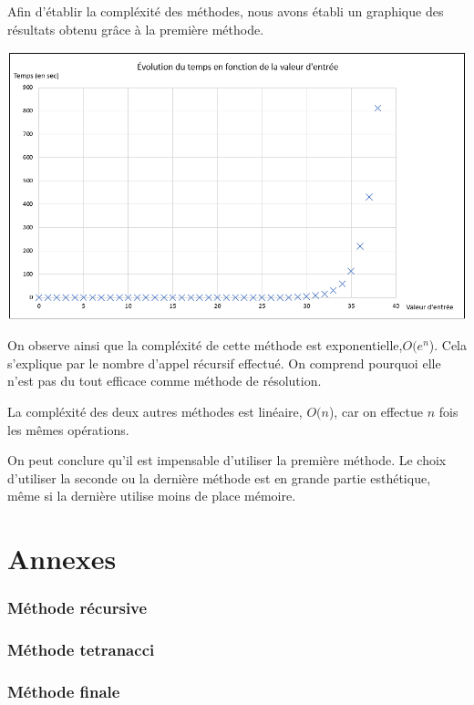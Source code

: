 \documentclass{article}
\newcommand{\code}[1]{}
\begin{document}
Afin d'établir la compléxité des méthodes, nous avons établi un graphique des résultats obtenu grâce à la première méthode.

\bigbreak
\begin{center}
\includegraphics[scale = 0.5]{Images/graphique.png}
\end{center}
\bigbreak

On observe ainsi que la compléxité de cette méthode est exponentielle,$ O(e^n$). Cela s'explique par le nombre d'appel récursif effectué. On comprend pourquoi elle n'est pas du tout efficace comme méthode de résolution.

La compléxité des deux autres méthodes est linéaire, $O(n$), car on effectue $n$ fois les mêmes opérations.

On peut conclure qu'il est impensable d'utiliser la première méthode. Le choix d'utiliser la seconde ou la dernière méthode est en grande partie esthétique, même si la dernière utilise moins de place mémoire.

\newpage
\part{Annexes}
\section*{Méthode récursive}
\code{Algos/Problem117_1_rapport.py}


\section*{Méthode tetranacci}
\code{Algos/Problem117_2_rapport.py}

\newpage
\section*{Méthode finale}
\code{Algos/Problem117_3_rapport.py}
\end{document}
